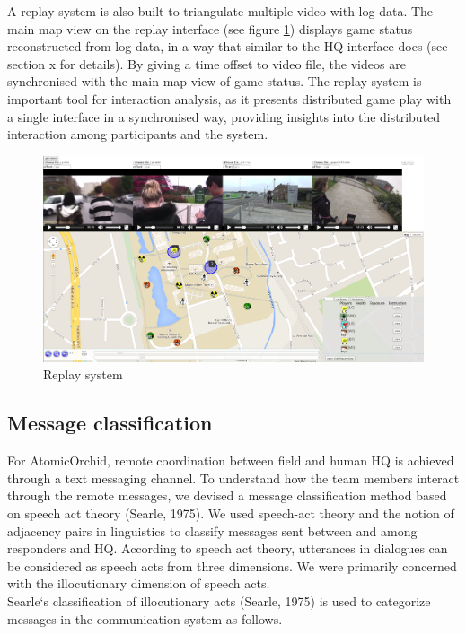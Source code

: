 A replay system is also built to triangulate multiple video with log data. The main map view on the replay interface (see figure \ref{fig:replay}) displays game status reconstructed from log data, in a way that similar to the HQ interface does (see section x for details). By giving a time offset to video file, the videos are synchronised with the main map view of game status. The replay system is important tool for interaction analysis, as it presents distributed game play with a single interface in a synchronised way, providing insights into the distributed interaction among participants and the system. \\

\begin{figure}[h]
  \centering
  \includegraphics[width=1\textwidth]{img/methodology/replay}
  \caption{Replay system}
  \label{fig:replay}
\end{figure}

\subsection{Message classification} 
For AtomicOrchid, remote coordination between field and human HQ is achieved through a text messaging channel. To understand how the team members interact through the remote messages, we devised a message classification method based on speech act theory (Searle, 1975). We used speech-act theory and the notion of adjacency pairs in linguistics to classify messages sent between and among responders and HQ. According to speech act theory, utterances in dialogues can be considered as speech acts from three dimensions. We were primarily concerned with the illocutionary dimension of speech acts.\\

Searle`s classification of illocutionary acts (Searle, 1975) is used to categorize messages in the communication system as follows.\\

